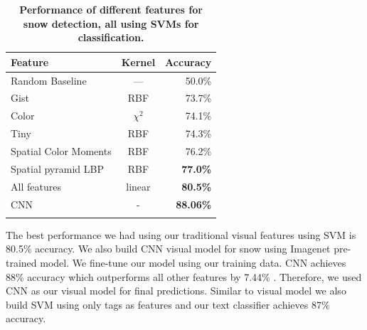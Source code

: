 
\begin{table}\centering
{}
\caption{\textbf{Performance of different features  for snow detection, all using SVMs for classification.} }
\label{tab:snow}
\begin{tabular}{@{}lcr@{}}\toprule
Feature & Kernel & Accuracy\\\midrule
Random Baseline  & --- & 50.0\%\\
Gist & RBF & 73.7\%\\
Color  & $\chi^2$ & 74.1\%\\
Tiny & RBF & 74.3\%\\
Spatial Color Moments & RBF & 76.2\%\\
Spatial pyramid LBP & RBF &\textbf{77.0\%}\\\midrule
All features  & linear & \textbf{80.5\%}\\
CNN& -& \textbf{88.06\%}\\
\bottomrule\\
\end{tabular}
\end{table}

The best performance we had using our traditional visual features using SVM is 80.5\% accuracy.  We also build CNN visual model for snow using Imagenet pre-trained model. We fine-tune our model using our training data. CNN  achieves 88\% accuracy which  outperforms all other features by 7.44\% . Therefore, we used CNN as our visual model for final predictions.  Similar to visual model we also build SVM using only tags as features and our text classifier achieves 87\% accuracy.




